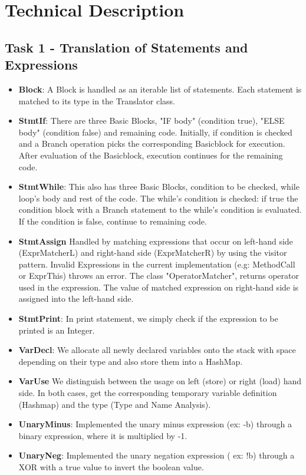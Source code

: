 \documentclass[paper=a4, fontsize=11pt]{scrartcl}
\numberwithin{equation}{section}		%
\numberwithin{figure}{section}			%
\numberwithin{table}{section}				%
\begin{document}
\section*{Technical Description}

\subsection*{Task 1 - Translation of Statements and Expressions}

\begin{itemize}
	\item \textbf{Block}: A Block is handled as an iterable list of statements. Each statement is matched to its type in the Translator class.
	\item \textbf{StmtIf}: There are three Basic Blocks, "IF body" (condition true), "ELSE body" (condition false) and remaining code. Initially, if condition is checked and a Branch operation picks the corresponding Basicblock for execution. After evaluation of the Basicblock, execution continues for the remaining code. 
	\item \textbf{StmtWhile}: This also has three Basic Blocks, condition to be checked, while loop's body and rest of the code. The while's condition is checked: if true the condition block with a Branch statement to the while's condition is evaluated. If the condition is false, continue to remaining code.
	\item \textbf{StmtAssign} Handled by matching expressions that occur on left-hand side (ExprMatcherL) and right-hand side (ExprMatcherR) by using the visitor pattern. Invalid Expressions in the current implementation (e.g: MethodCall or ExprThis) throws an error. The class "OperatorMatcher", returns operator used in the expression. The value of matched expression on right-hand side is assigned into the left-hand side. 
	\item \textbf{StmtPrint}: In print statement, we simply check if the expression to be printed is an Integer.
	\item \textbf{VarDecl}: We allocate all newly declared variables onto the stack with space depending on their type and also store them into a HashMap.
	\item \textbf{VarUse} We distinguish between the usage on left (store) or right (load) hand side. In both cases, get the corresponding temporary variable definition (Hashmap) and the type (Type and Name Analysis). 
	\item \textbf{UnaryMinus}: Implemented the unary minus expression (ex: -b) through a binary expression, where it is multiplied by -1. 
	\item \textbf{UnaryNeg}: Implemented the unary negation expression ( ex: !b) through a XOR with a true value to invert the boolean value. 
\end{itemize}
\end{document}

